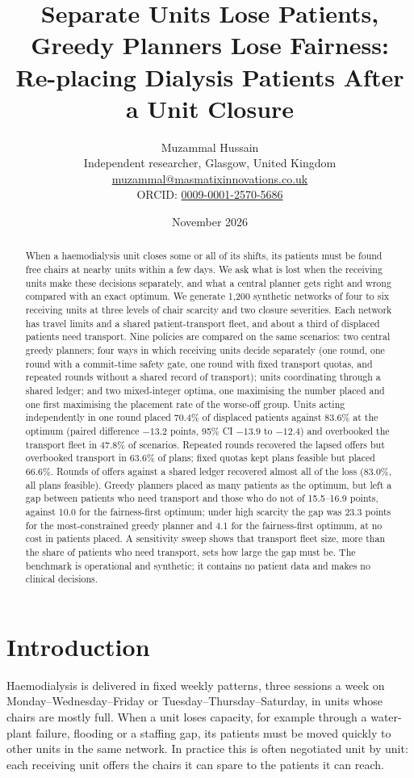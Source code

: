 \documentclass[11pt,a4paper]{article}
\title{\textbf{Separate Units Lose Patients, Greedy Planners Lose Fairness:\\Re-placing Dialysis Patients After a Unit Closure}}
\author{Muzammal Hussain\\
\small Independent researcher, Glasgow, United Kingdom\\
\small \href{mailto:muzammal@masmatixinnovations.co.uk}{muzammal@masmatixinnovations.co.uk}\\
\small ORCID: \href{https://orcid.org/0009-0001-2570-5686}{0009-0001-2570-5686}}
\date{\small November 2026}
\begin{document}
\maketitle

\begin{abstract}
\noindent
When a haemodialysis unit closes some or all of its shifts, its patients must be found free chairs at nearby
units within a few days. We ask what is lost when the receiving units make these decisions separately, and
what a central planner gets right and wrong compared with an exact optimum. We generate 1,200 synthetic
networks of four to six receiving units at three levels of chair scarcity and two closure severities. Each
network has travel limits and a shared patient-transport fleet, and about a third of displaced patients need
transport. Nine policies are compared on the same scenarios: two central greedy planners; four ways in which
receiving units decide separately (one round, one round with a commit-time safety gate, one round with fixed
transport quotas, and repeated rounds without a shared record of transport); units coordinating through a
shared ledger; and two mixed-integer optima, one maximising the number placed and one first maximising the
placement rate of the worse-off group. Units acting independently in one round placed 70.4\% of displaced
patients against 83.6\% at the optimum (paired difference $-13.2$ points, 95\% CI $-13.9$ to $-12.4$) and
overbooked the transport fleet in 47.8\% of scenarios. Repeated rounds recovered the lapsed offers but
overbooked transport in 63.6\% of plans; fixed quotas kept plans feasible but placed 66.6\%. Rounds of offers
against a shared ledger recovered almost all of the loss (83.0\%, all plans feasible). Greedy planners
placed as many patients as the optimum, but left a gap between patients who need transport and those who do
not of 15.5--16.9 points, against 10.0 for the fairness-first optimum; under high scarcity the gap was 23.3
points for the most-constrained greedy planner and 4.1 for the fairness-first optimum, at no cost in patients
placed. A sensitivity sweep shows that transport fleet size, more than the share of patients who need transport,
sets how large the gap must be. The benchmark is operational and synthetic; it contains no patient data and
makes no clinical decisions.
\end{abstract}

\section{Introduction}
Haemodialysis is delivered in fixed weekly patterns, three sessions a week on Monday--Wednesday--Friday or
Tuesday--Thursday--Saturday, in units whose chairs are mostly full. When a unit loses capacity, for example
through a water-plant failure, flooding or a staffing gap, its patients must be moved quickly to other units
in the same network. In practice this is often negotiated unit by unit: each receiving unit offers the chairs
it can spare to the patients it can reach.
\end{document}
